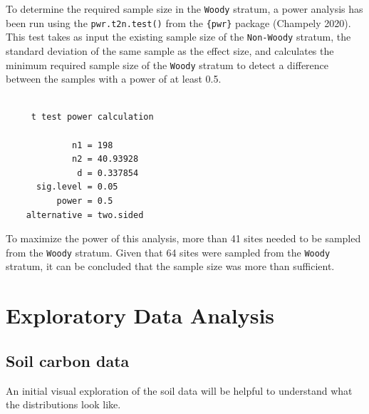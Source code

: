 \documentclass[
  letterpaper,
  DIV=11,
  numbers=noendperiod]{scrartcl}
\begin{document}
To determine the required sample size in the \texttt{Woody} stratum, a
power analysis has been run using the \texttt{pwr.t2n.test()} from the
\texttt{\{pwr\}} package (Champely 2020). This test takes as input the
existing sample size of the \texttt{Non-Woody} stratum, the standard
deviation of the same sample as the effect size, and calculates the
minimum required sample size of the \texttt{Woody} stratum to detect a
difference between the samples with a power of at least 0.5.

\begin{verbatim}

     t test power calculation 

             n1 = 198
             n2 = 40.93928
              d = 0.337854
      sig.level = 0.05
          power = 0.5
    alternative = two.sided
\end{verbatim}

To maximize the power of this analysis, more than 41 sites needed to be
sampled from the \texttt{Woody} stratum. Given that 64 sites were
sampled from the \texttt{Woody} stratum, it can be concluded that the
sample size was more than sufficient.

\section{Exploratory Data Analysis}\label{exploratory-data-analysis}

\subsection{Soil carbon data}\label{soil-carbon-data}

An initial visual exploration of the soil data will be helpful to
understand what the distributions look like.

\begin{table}

\caption{\label{tbl-soc-summary}}


\end{table}%
\end{document}
